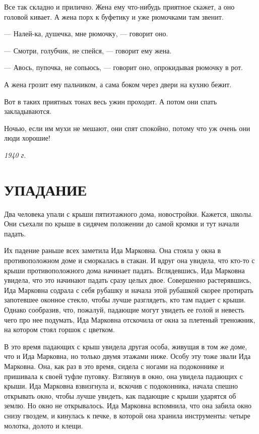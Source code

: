 \documentclass[a4paper,12pt]{article}
\begin{document}
Все так складно и прилично. Жена ему что-нибудь приятное скажет, а оно головой кивает. А жена порх к буфетику и уже рюмочками там звенит.

— Налей-ка, душечка, мне рюмочку, — говорит оно.

— Смотри, голубчик, не спейся, — говорит ему жена.

— Авось, пупочка, не сопьюсь, — говорит оно, опрокидывая рюмочку в рот.

А жена грозит ему пальчиком, а сама боком через двери на кухню бежит.

Вот в таких приятных тонах весь ужин проходит. А потом они спать закладываются.

Ночью, если им мухи не мешают, они спят спокойно, потому что уж очень они люди хорошие!

\begin{flushright}
\textit{1940 г.}
\end{flushright}

\section*{УПАДАНИЕ}

Два человека упали с крыши пятиэтажного дома, новостройки. Кажется, школы. Они съехали по крыше в сидячем положении до самой кромки и тут начали падать.

Их падение раньше всех заметила Ида Марковна. Она стояла у окна в противоположном доме и сморкалась в стакан. И вдруг она увидела, что кто-то с крыши противоположного дома начинает падать. Вглядевшись, Ида Марковна увидела, что это начинают падать сразу целых двое. Совершенно растерявшись, Ида Марковна содрала с себя рубашку и начала этой рубашкой скорее протирать запотевшее оконное стекло, чтобы лучше разглядеть, кто там падает с крыши. Однако сообразив, что, пожалуй, падающие могут увидеть ее голой и невесть чего про нее подумать, Ида Марковна отскочила от окна за плетеный треножник, на котором стоял горшок с цветком.

В это время падающих с крыш увидела другая особа, живущая в том же доме, что и Ида Марковна, но только двумя этажами ниже. Особу эту тоже звали Ида Марковна. Она, как раз в это время, сидела с ногами на подоконнике и пришивала к своей туфле пуговку. Взглянув в окно, она увидела падающих с крыши. Ида Марковна взвизгнула и, вскочив с подоконника, начала спешно открывать окно, чтобы лучше увидеть, как падающие с крыши ударятся об землю. Но окно не открывалось. Ида Марковна вспомнила, что она забила окно снизу гвоздем, и кинулась к печке, в которой она хранила инструменты: четыре молотка, долото и клещи.
\end{document}
